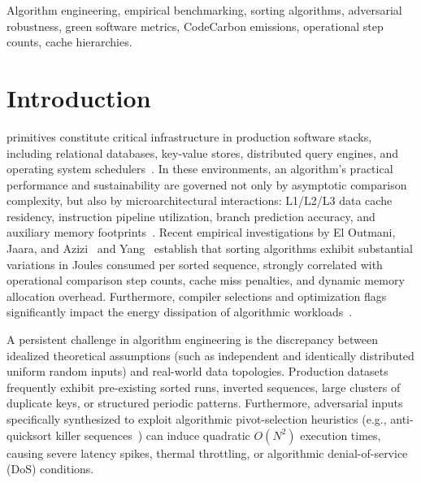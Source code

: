 \documentclass[journal]{IEEEtran}
\begin{document}
\begin{IEEEkeywords}
Algorithm engineering, empirical benchmarking, sorting algorithms, adversarial robustness, green software metrics, CodeCarbon emissions, operational step counts, cache hierarchies.
\end{IEEEkeywords}

\section{Introduction}
 primitives constitute critical infrastructure in production software stacks, including relational databases, key-value stores, distributed query engines, and operating system schedulers~\cite{hoare1962quicksort,knuth1998art,bentley1993engineering}. In these environments, an algorithm's practical performance and sustainability are governed not only by asymptotic comparison complexity, but also by microarchitectural interactions: L1/L2/L3 data cache residency, instruction pipeline utilization, branch prediction accuracy, and auxiliary memory footprints~\cite{garciamireles2026sustainability,devadas2026carbon,frigo2012cache}. Recent empirical investigations by El Outmani, Jaara, and Azizi~\cite{eloutmani2025energy} and Yang~\cite{yang2025holistic} establish that sorting algorithms exhibit substantial variations in Joules consumed per sorted sequence, strongly correlated with operational comparison step counts, cache miss penalties, and dynamic memory allocation overhead. Furthermore, compiler selections and optimization flags significantly impact the energy dissipation of algorithmic workloads~\cite{bylina2025importance,jimenez2025compiler}.

A persistent challenge in algorithm engineering is the discrepancy between idealized theoretical assumptions (such as independent and identically distributed uniform random inputs) and real-world data topologies. Production datasets frequently exhibit pre-existing sorted runs, inverted sequences, large clusters of duplicate keys, or structured periodic patterns. Furthermore, adversarial inputs specifically synthesized to exploit algorithmic pivot-selection heuristics (e.g., anti-quicksort killer sequences~\cite{musser1997introspective}) can induce quadratic $O(N^2)$ execution times, causing severe latency spikes, thermal throttling, or algorithmic denial-of-service (DoS) conditions.
\end{document}
